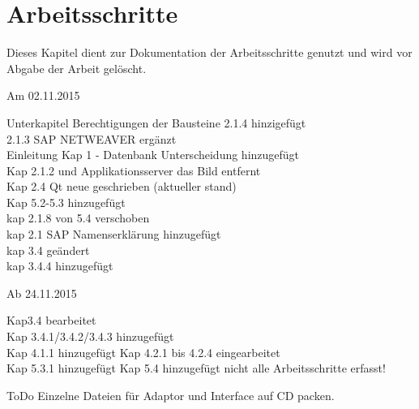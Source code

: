 \chapter{Arbeitsschritte}
Dieses Kapitel dient zur Dokumentation der Arbeitsschritte genutzt und wird vor Abgabe der Arbeit gelöscht.

Am 02.11.2015

	 Unterkapitel Berechtigungen der Bausteine 2.1.4 hinzigefügt\\
	 2.1.3 SAP NETWEAVER ergänzt\\
	 Einleitung Kap 1 - Datenbank Unterscheidung hinzugefügt \\
	 Kap 2.1.2  und Applikationsserver das Bild entfernt\\
	 Kap 2.4 Qt neue geschrieben (aktueller stand)\\
	 Kap 5.2-5.3 hinzugefügt\\
	 kap 2.1.8 von 5.4 verschoben\\
	 kap 2.1 SAP Namenserklärung hinzugefügt\\
	kap 3.4 geändert \\
	kap 3.4.4 hinzugefügt

Ab 24.11.2015

	Kap3.4 bearbeitet\\
	Kap 3.4.1/3.4.2/3.4.3 hinzugefügt\\
	Kap 4.1.1 hinzugefügt
	Kap 4.2.1 bis 4.2.4 eingearbeitet\\
	Kap 5.3.1 hinzugefügt
	Kap 5.4 hinzugefügt
	nicht alle Arbeitsschritte erfasst!
	
	
	
ToDo
Einzelne Dateien für Adaptor und Interface auf CD packen.